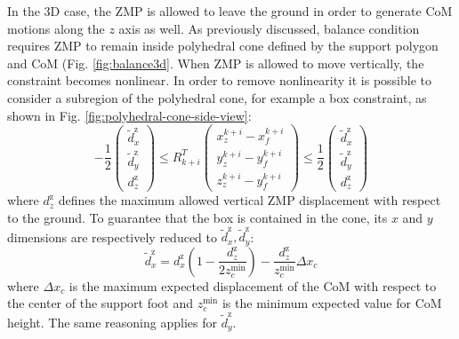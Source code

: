 In the 3D case, the ZMP is allowed to leave the ground in order to
generate CoM motions along the $z$ axis as well.
As previously discussed, balance condition requires ZMP to remain inside
polyhedral cone defined by the support polygon and CoM
(Fig. \ref{fig:balance3d}. When ZMP is allowed to move vertically,
the constraint becomes nonlinear. In order to remove nonlinearity it is 
possible to consider a subregion of the polyhedral cone, for example a box
constraint, as shown in Fig. \ref{fig:polyhedral-cone-side-view}:
\begin{equation}
  \label{eq:zmp-constraint-3d}
  -\frac{1}{2}
  \begin{pmatrix}
    \tilde{d}_x^\text{z} \\
    \tilde{d}_y^\text{z} \\
    d_z^\text{z}
  \end{pmatrix}
  \le
  R_{k+i}^T
  \begin{pmatrix}
    x_z^{k+i} - x_f^{k+i} \\
    y_z^{k+i} - y_f^{k+i} \\
    z_z^{k+i} - y_f^{k+i}
  \end{pmatrix}
  \le
  \frac{1}{2}
  \begin{pmatrix}
    \tilde{d}_x^\text{z} \\
    \tilde{d}_y^\text{z} \\
    d_z^\text{z}
  \end{pmatrix}
\end{equation}
where $d_z^\text{z}$ defines the maximum allowed vertical ZMP displacement
with respect to the ground.
To guarantee that the box is contained in the cone, its $x$ and $y$ dimensions 
are respectively reduced to $\tilde{d}_x^\text{z}, \tilde{d}_y^\text{z}$:
\begin{equation}
  \tilde{d}_x^\text{z} = d_x^\text{z} \left( 1 -
      \frac{d_z^\text{z}}{2z_c^{\min}} \right)
      - \frac{d_z^\text{z}}{z_c^{\min}}\Delta x_c
\end{equation}
where $\Delta x_c$ is the maximum expected displacement of the CoM with respect 
to the center of the support foot and $z_c^{\min}$ is the minimum expected
value for CoM height. The same reasoning applies for $\tilde{d}_y^\text{z}$.

